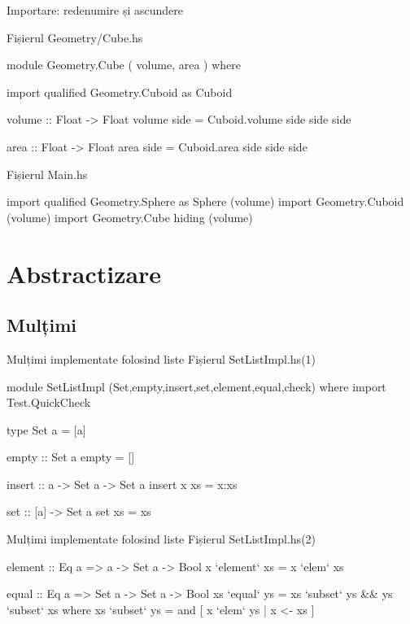 \documentclass[xcolor=pdftex,romanian,colorlinks]{beamer}
\begin{document}
\begin{frame}[fragile]{Importare: redenumire și ascundere}
\begin{block}
{Fișierul Geometry/Cube.hs}
\vspace{-2ex}
\begin{asciihs}
module Geometry.Cube ( volume, area ) where  

import qualified Geometry.Cuboid as Cuboid

volume :: Float -> Float  
volume side = Cuboid.volume side side side  
  
area :: Float -> Float  
area side = Cuboid.area side side side  
\end{asciihs}
\end{block}
\begin{block}
{Fișierul Main.hs}
\vspace{-2ex}
\begin{asciihs}
import qualified Geometry.Sphere as Sphere (volume)
import Geometry.Cuboid (volume)
import Geometry.Cube hiding (volume)
\end{asciihs}
\end{block}
\end{frame}

\section{Abstractizare}

\subsection{Mulțimi}

\begin{frame}[fragile]{Mulțimi implementate folosind liste}
{Fișierul SetListImpl.hs\hfill (1)}
\begin{asciihs}
module SetListImpl
(Set,empty,insert,set,element,equal,check) where
import Test.QuickCheck

type Set a = [a]

empty :: Set a
empty = []

insert :: a -> Set a -> Set a
insert x xs = x:xs

set :: [a] -> Set a
set xs = xs
\end{asciihs}
\end{frame}


\begin{frame}[fragile]{Mulțimi implementate folosind liste}
{Fișierul SetListImpl.hs\hfill (2)}
\begin{asciihs}
element :: Eq a => a -> Set a -> Bool
x `element` xs = x `elem` xs

equal :: Eq a => Set a -> Set a -> Bool
xs `equal` ys = xs `subset` ys && ys `subset` xs
  where
    xs `subset` ys = and [ x `elem` ys | x <- xs ]
\end{asciihs}
\end{frame}
\end{document}
